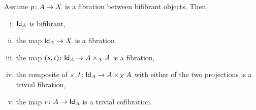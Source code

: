 \documentclass[reqno,10pt,a4paper,oneside,draft]{amsart}
\begin{document}
\begin{proposition}
\label{proposition:MainPathObject}
Assume $p \colon A \rightarrow X $ is a fibration between bifibrant objects. Then,
\begin{enumerate}[(i)] 
\item \label{proposition:MainPathObject:IdBifib} $\mathsf{Id}_A$ is bifibrant, 
\item the map $\mathsf{Id}_A \rightarrow X$ is a fibration
\item the map $(s, t) \colon \mathsf{Id}_A \rightarrow A \times_{X} A$ is a fibration,
\item the composite of $s \, , t \colon \mathsf{Id}_A \rightarrow A \times_{X} A$  with either of the two projections is a trivial fibration,
\item the map $r \colon A \rightarrow \mathsf{Id}_A$ is a trivial cofibration.
\end{enumerate}
\end{proposition}
\end{document}
